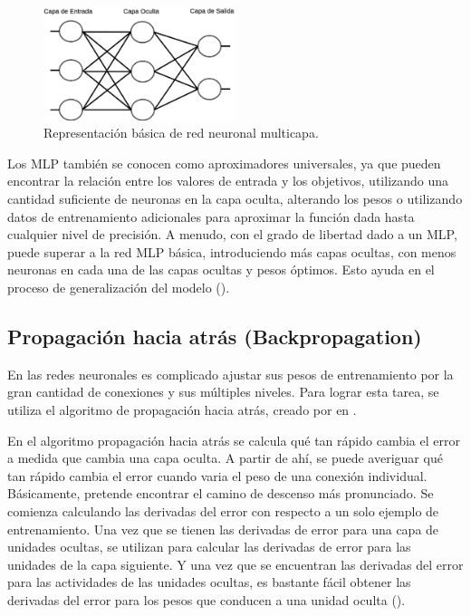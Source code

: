 \begin{figure}[H]
    \centering
    \includegraphics[width=0.5\textwidth]{MarcoTeorico/imgs/MLP.png}
    \caption{Representación básica de red neuronal multicapa.}
    \label{fig:mlp}
\end{figure}

Los MLP también se conocen como aproximadores universales, ya que pueden encontrar la relación entre los valores de entrada y los objetivos, utilizando una cantidad suficiente de neuronas en la capa oculta, alterando los pesos o utilizando datos de entrenamiento adicionales para aproximar la función dada hasta cualquier nivel de precisión. A menudo, con el grado de libertad dado a un MLP, puede superar a la red MLP básica, introduciendo más capas ocultas, con menos neuronas en cada una de las capas ocultas y pesos óptimos. Esto ayuda en el proceso de generalización del modelo (\cite{goyal2018Deep}).

\subsection{Propagación hacia atrás (Backpropagation)}

En las redes neuronales es complicado ajustar sus pesos de entrenamiento por la gran cantidad de conexiones y sus múltiples niveles. Para lograr esta tarea, se utiliza el algoritmo de propagación hacia atrás, creado por \citeauthor{rumelhart1986Parallel} en \citeyear{rumelhart1986Parallel}.

En el algoritmo propagación hacia atrás se calcula qué tan rápido cambia el error a medida que cambia una capa oculta. A partir de ahí, se puede averiguar qué tan rápido cambia el error cuando varia el peso de una conexión individual. Básicamente, pretende encontrar el camino de descenso más pronunciado. Se comienza calculando las derivadas del error con respecto a un solo ejemplo de entrenamiento. Una vez que se tienen las derivadas de error para una capa de unidades ocultas, se utilizan para calcular las derivadas de error para las unidades de la capa siguiente. Y una vez que se encuentran las derivadas del error para las actividades de las unidades ocultas, es bastante fácil obtener las derivadas del error para los pesos que conducen a una unidad oculta (\cite{buduma2017Fundamentals}).

